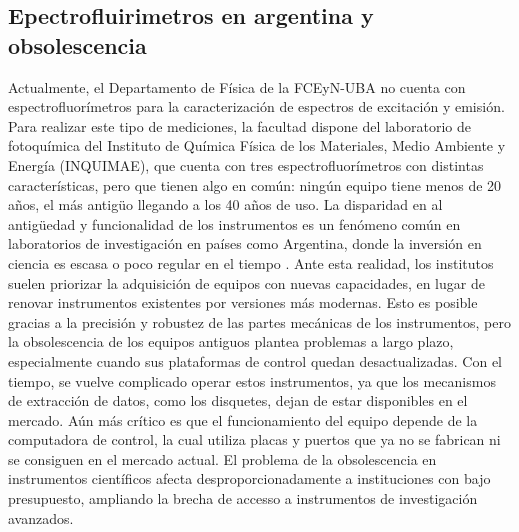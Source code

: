 \subsection{Epectrofluirimetros en argentina y obsolescencia}

Actualmente, el Departamento de Física de la FCEyN-UBA no cuenta con espectrofluorímetros para la caracterización de espectros de excitación y emisión.  
Para realizar este tipo de mediciones, la facultad dispone del laboratorio de fotoquímica del Instituto de Química Física de los Materiales, Medio Ambiente y Energía (INQUIMAE), que cuenta con tres espectrofluorímetros con distintas características, pero que tienen algo en común: ningún equipo tiene menos de 20 años, el más antigüo llegando a los 40 años de uso.
La disparidad en al antigüedad y funcionalidad de los instrumentos es un fenómeno común en laboratorios de investigación en países como Argentina, donde la inversión en ciencia es escasa o poco regular en el tiempo \cite{cioccaRealityScientificResearch2017}. 
Ante esta realidad, los institutos suelen priorizar la adquisición de equipos con nuevas capacidades, en lugar de renovar instrumentos existentes por versiones más modernas.  
Esto es posible gracias a la precisión y robustez de las partes mecánicas de los instrumentos, pero la obsolescencia de los equipos antiguos plantea problemas a largo plazo, especialmente cuando sus plataformas de control quedan desactualizadas.  
Con el tiempo, se vuelve complicado operar estos instrumentos, ya que los mecanismos de extracción de datos, como los disquetes, dejan de estar disponibles en el mercado. 
Aún más crítico es que el funcionamiento del equipo depende de la computadora de control, la cual utiliza placas y puertos que ya no se fabrican ni se consiguen en el mercado actual.  
El problema de la obsolescencia en instrumentos científicos afecta desproporcionadamente a instituciones con bajo presupuesto, ampliando la brecha de accesso a instrumentos de investigación avanzados.


